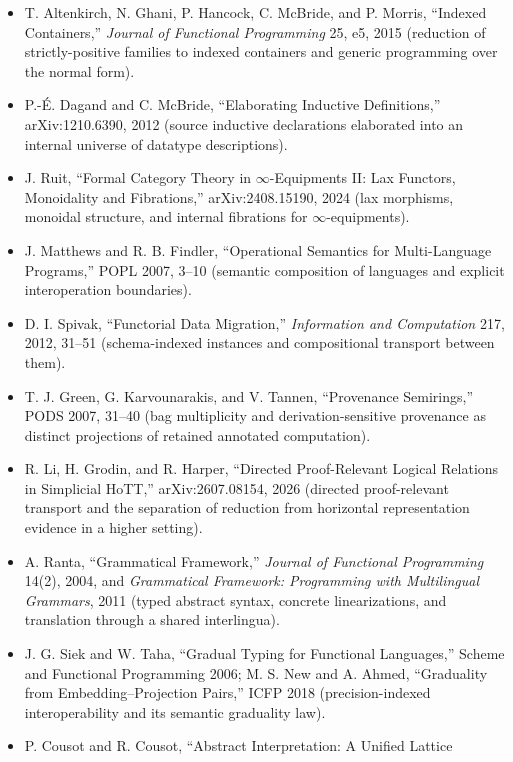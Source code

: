 \documentclass[11pt]{article}
\begin{document}
\begin{itemize}
  Families,'' CATS 2007, 111--121 (strictly-positive indexed families and
  their indexed-container normal forms).
\item T. Altenkirch, N. Ghani, P. Hancock, C. McBride, and P. Morris,
  ``Indexed Containers,'' \emph{Journal of Functional Programming} 25, e5,
  2015 (reduction of strictly-positive families to indexed containers and
  generic programming over the normal form).
\item P.-\'E. Dagand and C. McBride, ``Elaborating Inductive Definitions,''
  arXiv:1210.6390, 2012 (source inductive declarations elaborated into an
  internal universe of datatype descriptions).
\item J. Ruit, ``Formal Category Theory in $\infty$-Equipments II: Lax
  Functors, Monoidality and Fibrations,'' arXiv:2408.15190, 2024 (lax
  morphisms, monoidal structure, and internal fibrations for
  $\infty$-equipments).
\item J. Matthews and R. B. Findler, ``Operational Semantics for
  Multi-Language Programs,'' POPL 2007, 3--10
  (semantic composition of languages and explicit interoperation boundaries).
\item D. I. Spivak, ``Functorial Data Migration,''
  \emph{Information and Computation} 217, 2012, 31--51
  (schema-indexed instances and compositional transport between them).
\item T. J. Green, G. Karvounarakis, and V. Tannen, ``Provenance
  Semirings,'' PODS 2007, 31--40
  (bag multiplicity and derivation-sensitive provenance as distinct
  projections of retained annotated computation).
\item R. Li, H. Grodin, and R. Harper, ``Directed Proof-Relevant Logical
  Relations in Simplicial HoTT,'' arXiv:2607.08154, 2026
  (directed proof-relevant transport and the separation of reduction from
  horizontal representation evidence in a higher setting).
\item A. Ranta, ``Grammatical Framework,'' \emph{Journal of Functional
  Programming} 14(2), 2004, and \emph{Grammatical Framework: Programming with
  Multilingual Grammars}, 2011 (typed abstract syntax, concrete linearizations,
  and translation through a shared interlingua).
\item J. G. Siek and W. Taha, ``Gradual Typing for Functional Languages,''
  Scheme and Functional Programming 2006; M. S. New and A. Ahmed,
  ``Graduality from Embedding--Projection Pairs,'' ICFP 2018
  (precision-indexed interoperability and its semantic graduality law).
\item P. Cousot and R. Cousot, ``Abstract Interpretation: A Unified Lattice

\end{itemize}
\end{document}

